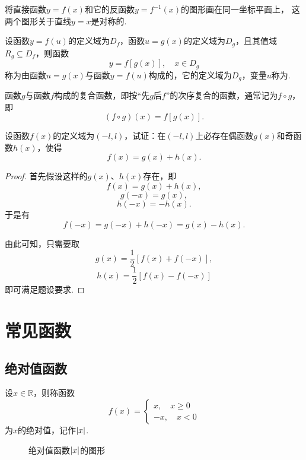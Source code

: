 \begin{property}
将直接函数\(y=f(x)\)和它的反函数\(y=f^{-1}(x)\)的图形画在同一坐标平面上，%
这两个图形关于直线\(y=x\)是对称的.
\end{property}

\begin{definition}
设函数\(y=f(u)\)的定义域为\(D_f\)，函数\(u=g(x)\)的定义域为\(D_g\)，且其值域\(R_g \subseteq D_f\)，则函数\[
y = f[g(x)],
\quad x \in D_g
\]称为由函数\(u=g(x)\)与函数\(y=f(u)\)构成的，它的定义域为\(D_g\)，变量\(u\)称为.

函数\(g\)与函数\(f\)构成的复合函数，即按“先\(g\)后\(f\)”的次序复合的函数，通常记为\(f \circ g\)，即\[
(f \circ g)(x) = f[g(x)].
\]
\end{definition}

\begin{example}
设函数\(f(x)\)的定义域为\((-l,l)\)，试证：在\((-l,l)\)上必存在偶函数\(g(x)\)和奇函数\(h(x)\)，使得\[
f(x) = g(x)+h(x).
\]
\begin{proof}
首先假设这样的\(g(x)\)、\(h(x)\)存在，即\[
f(x) = g(x) + h(x),
\]\[
g(-x) = g(x),
\]\[
h(-x) = -h(x).
\]于是有\[
f(-x) = g(-x) + h(-x) = g(x) - h(x).
\]

由此可知，只需要取\[
g(x) = \frac{1}{2} [f(x) + f(-x)],
\]\[
h(x) = \frac{1}{2} [f(x) - f(-x)]
\]即可满足题设要求.
\end{proof}
\end{example}

\section{常见函数}
\subsection{绝对值函数}
\begin{definition}[绝对值]
设\(x \in \mathbb{R}\)，则称函数\[
f(x) = \left\{ \begin{array}{c}
x, \quad x \geq 0 \\
-x, \quad x < 0
\end{array} \right.
\]为\(x\)的绝对值，记作\(\abs{x}\).
\end{definition}

\begin{figure}[ht]
\centering
{}
\caption{绝对值函数\(\abs{x}\)的图形}
\end{figure}

